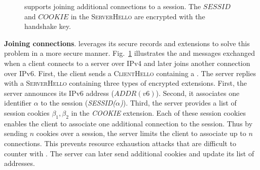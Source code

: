 \begin{figure}[!t]
	\centering
	\caption{\tcpls supports joining additional \tcp
		connections to a \tcpls session. The $SESSID$ and $COOKIE$ in the \textmd{\textsc{ServerHello}} are encrypted with the
		handshake key.}
	\label{fig:join-example}
\end{figure}

\textbf{Joining \tcp connections}. \tcpls leverages its secure records and extensions to solve this problem in a more secure manner. Fig.~\ref{fig:join-example} illustrates the \tls and \tcpls messages exchanged when a client connects to a server over IPv4 and later joins another connection over IPv6.
First, the client sends a \textsc{ClientHello} containing a \hello. The server replies with a \textsc{ServerHello} containing three types of encrypted extensions. First, the server announces its IPv6 address ($ADDR(v6)$). Second, it associates one identifier $\alpha$ to the \tcpls session (\emph{SESSID($\alpha$)}).
Third, the server provides a list of \tcpls session cookies $\beta_1,\beta_2$ in the \emph{COOKIE} extension. Each of these session cookies enables the client
to associate one additional \tcp connection to the \tcpls session. Thus by sending $n$ cookies over a session, the server limits the client to associate up to $n$ \tcp connections. This prevents resource exhaustion attacks
that are difficult to counter with \mptcp. The server can later send additional
cookies and update its list of addresses.

